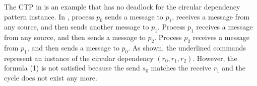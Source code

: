 The CTP in  is an example that has no deadlock for the circular dependency pattern instance. In , process $p_0$ sends a message to $p_1$, receives a message from any source, and then sends another message to $p_1$. Process $p_1$ receives a message from any source, and then sends a message to $p_2$. Process $p_2$ receives a message from $p_1$, and then sends a message to $p_0$. As shown, the underlined commands represent an instance of the circular dependency $(r_0,r_1,r_2)$. However, the formula (1) is not satisfied because the send $s_0$ matches the receive $r_1$ and the cycle does not exist any more. 

